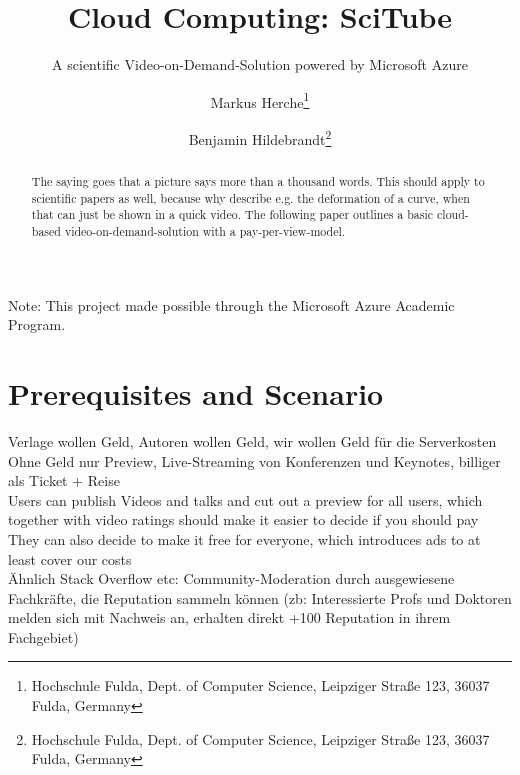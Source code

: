 \documentclass[english]{lni}
\begin{document}
\title{Cloud Computing: SciTube}
\subtitle{A scientific Video-on-Demand-Solution powered by Microsoft Azure}
\author[Markus Herche \and Benjamin Hildebrandt]
{Markus Herche\footnote{Hochschule Fulda, Dept. of Computer Science, Leipziger Straße 123, 36037 Fulda,
Germany } \and
Benjamin Hildebrandt\footnote{Hochschule Fulda, Dept. of Computer Science, Leipziger Straße 123, 36037 Fulda,
Germany
}}



\maketitle

\begin{abstract}
    The saying goes that a picture says more than a thousand words. This should apply to scientific papers as well,
    because why describe e.g. the deformation of a curve, when that can just be shown in a quick video. The following 
    paper outlines a basic cloud-based video-on-demand-solution with a pay-per-view-model. 
\end{abstract}

Note: This project made possible through the Microsoft Azure Academic Program.

\section{Prerequisites and Scenario}
Verlage wollen Geld, Autoren wollen Geld, wir wollen Geld für die Serverkosten\\

Ohne Geld nur Preview, Live-Streaming von Konferenzen und Keynotes, billiger als Ticket + Reise\\

Users can publish Videos and talks and cut out a preview for all users, which together with video ratings should make it easier to decide if you should pay
They can also decide to make it free for everyone, which introduces ads to at least cover our costs\\

Ähnlich Stack Overflow etc: Community-Moderation durch ausgewiesene Fachkräfte, die Reputation sammeln können
(zb: Interessierte Profs und Doktoren melden sich mit Nachweis an, erhalten direkt +100 Reputation in ihrem Fachgebiet)
\end{document}
